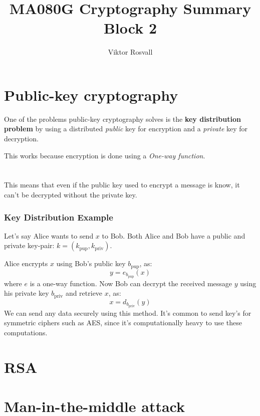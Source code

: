 \documentclass{article}
\title{MA080G Cryptography Summary Block 2}
\author{Viktor Rosvall}
\begin{document}
	\maketitle
	
	\section*{Public-key cryptography}
	One of the problems public-key cryptography solves is the \textbf{key distribution problem} by using a distributed \textit{public} key for encryption and a \textit{private} key for decryption.
	
	This works because encryption is done using a \textit{One-way function}.
	\\
	\\
	\\ 
	This means that even if the public key used to encrypt a message is know, it can't be decrypted without the private key. \cite{pubkeysummary}
	
	\subsubsection*{Key Distribution Example \cite{pubkeysummary}}
	Let's say Alice wants to send $x$ to Bob. Both Alice and Bob have a public and private key-pair: $k = (k_{\text{pup}},k_{\text{priv}})$. 
	
	Alice encrypts $x$ using Bob's public key $b_{\text{pup}}$, as:
	$$
	y = e_{b_{\text{pup}}}(x)
	$$ 
	where $e$ is a one-way function. Now Bob can decrypt the received message $y$  using his private key $b_{\text{priv}}$ and retrieve $x$, as:
	$$
	x = d_{b_{\text{priv}}}(y)
	$$
	We can send any data securely using this method. It's common to send key's for symmetric ciphers such as AES, since it's computationally heavy to use these computations. 
	
	\section*{RSA} 
		
	\section*{Man-in-the-middle attack} 
	
\end{document}
